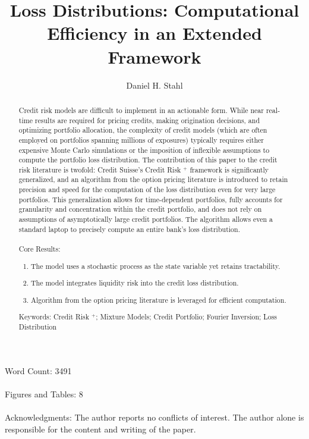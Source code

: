 \documentclass[12pt]{article}
\theoremstyle{definition}
\begin{document}
\title{Loss Distributions: Computational Efficiency in an Extended Framework}
\date{}
\author{Daniel H. Stahl}

\maketitle
Word Count: 3491
\\
\\
Figures and Tables: 8
\\
\\
Acknowledgments: The author reports no conflicts of interest.  The author alone is responsible for the content and writing of the paper.
\newpage
 \begin{abstract}
Credit risk models are difficult to implement in an actionable form.  While near real-time results are required for pricing credits, making origination decisions, and optimizing portfolio allocation, the complexity of credit models (which are often employed on portfolios spanning millions of exposures) typically requires either expensive Monte Carlo simulations or the imposition of inflexible assumptions to compute the portfolio loss distribution.  The contribution of this paper to the credit risk literature is twofold: Credit Suisse's Credit Risk \(^+\) framework is significantly generalized, and an algorithm from the option pricing literature is introduced to retain precision and speed for the computation of the loss distribution even for very large portfolios.  This generalization allows for time-dependent portfolios, fully accounts for granularity and concentration within the credit portfolio, and does not rely on assumptions of asymptotically large credit portfolios.  The algorithm allows even a standard laptop to precisely compute an entire bank's loss distribution.
\\
\\
Core Results:
\begin{enumerate}
\item The model uses a stochastic process as the state variable yet retains tractability.
\item The model integrates liquidity risk into the credit loss distribution.
\item Algorithm from the option pricing literature is leveraged for efficient computation.

\end{enumerate}

Keywords: Credit Risk \(^+\); Mixture Models; Credit Portfolio; Fourier Inversion; Loss Distribution
\end{abstract}
\end{document}
